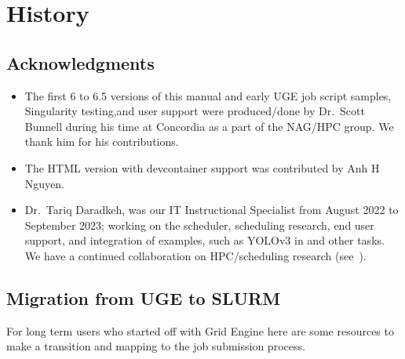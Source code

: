 \section{History}
\label{sect:history}

\subsection{Acknowledgments}
\label{sect:acks}

\begin{itemize}
	\item
    The first 6 to 6.5 versions of this manual and early UGE job script samples, Singularity testing,and user support
    were produced/done by Dr.~Scott Bunnell during his time at Concordia as a part of the NAG/HPC group.
    We thank him for his contributions.
	\item
    The HTML version with devcontainer support was contributed by Anh H Nguyen.
	\item
    Dr.~Tariq Daradkeh, was our IT Instructional Specialist from August 2022 to September 2023;
    working on the scheduler, scheduling research, end user support, and integration of
    examples, such as YOLOv3 in  and other tasks. We have a continued
    collaboration on HPC/scheduling research (see~\cite{job-failure-prediction-compsysarch2024}).
\end{itemize}

\subsection{Migration from UGE to SLURM}
\label{appdx:uge-to-slurm}

For long term users who started off with Grid Engine here are some resources
to make a transition and mapping to the job submission process.

